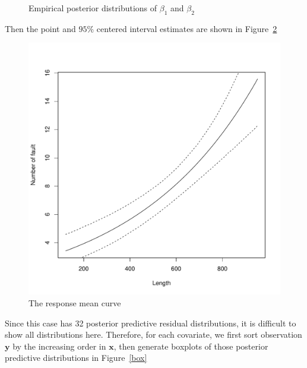 \documentclass[]{article}
\begin{document}
\begin{enumerate}
{\begin{itemize}
\begin{figure}[ht!]
				\caption{Empirical posterior distributions of $\beta_1$ and $\beta_2$}
				\label{pos}
			\end{figure}
			 Then the point and $95\%$ centered interval estimates are shown in Figure~\ref{RMC}
			 \begin{figure}[ht!]
			 	\centering
			 	\includegraphics[scale = 0.4]{"pic/HW5_1/RMC"}
			 	\caption{The response mean curve}
			 	\label{RMC}
			 \end{figure}
			 Since this case has 32 posterior predictive residual distributions, it is difficult to show all distributions here. Therefore, for each covariate, we first sort observation $\bm y$ by the increasing order in $\bm x$, then generate boxplots of those posterior predictive distributions in Figure~\ref{box}
			 \begin{figure}[ht!]
			 	\centering

\end{figure}
\end{itemize}}
\end{enumerate}
\end{document}
